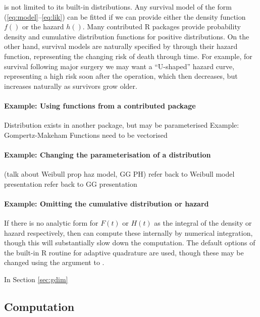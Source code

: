 \documentclass[nojss,nofooter]{jss}
\begin{document}
 is not limited to its built-in distributions.  Any
survival model of the form (\ref{eq:model}--\ref{eq:lik}) can be
fitted if we can provide either the density function $f()$ or the hazard $h()$.
Many contributed R packages provide probability density and cumulative
distribution functions for positive distributions.  On the other hand,
survival models are naturally specified by through their hazard
function, representing the changing risk of death through time.  For
example, for survival following major surgery we may want a
``U-shaped'' hazard curve, representing a high risk soon after the
operation, which then decreases, but increases naturally as survivors
grow older.

    
\paragraph{Example: Using functions from a contributed package}

Distribution exists in another package, but may be parameterised 
Example: Gompertz-Makeham
Functions need to be vectorised 

\paragraph{Example: Changing the parameterisation of a distribution}

(talk about Weibull prop haz model, GG PH)
refer back to Weibull model presentation
refer back to GG presentation 

\paragraph{Example: Omitting the cumulative distribution or hazard}

If there is no analytic form for $F(t)$ or $H(t)$ as the integral of
the density or hazard respectively, then  can compute
these internally by numerical integration, though this will
substantially slow down the computation.  The default options of the
built-in R routine  for adaptive quadrature are used,
though these may be changed using the  argument to
.


In Section \ref{sec:gdim} 


\subsection{Computation}
\end{document}
